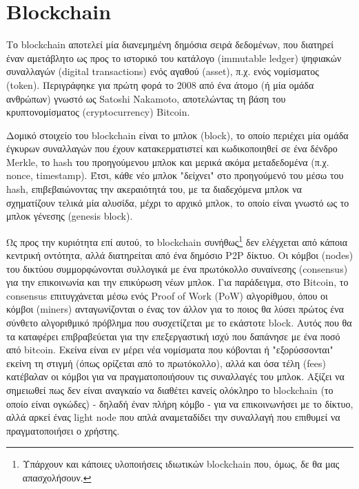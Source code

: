 \section{Blockchain}

Το blockchain αποτελεί μία διανεμημένη δημόσια σειρά δεδομένων, που διατηρεί έναν αμετάβλητο ως προς το ιστορικό του κατάλογο (immutable ledger) ψηφιακών συναλλαγών (digital transactions) ενός αγαθού (asset), π.χ. ενός νομίσματος (token). Περιγράφηκε για πρώτη φορά το 2008 από ένα άτομο (ή μία ομάδα ανθρώπων) γνωστό ως Satoshi Nakamoto, αποτελώντας τη βάση του κρυπτονομίσματος (cryptocurrency) Bitcoin.\cite{2.5-bitcoin}

Δομικό στοιχείο του blockchain είναι το μπλοκ (block), το οποίο περιέχει μία ομάδα έγκυρων συναλλαγών που έχουν κατακερματιστεί και κωδικοποιηθεί σε ένα δένδρο Merkle, το hash του προηγούμενου μπλοκ και μερικά ακόμα μεταδεδομένα (π.χ. nonce, timestamp). Έτσι, κάθε νέο μπλοκ "δείχνει" στο προηγούμενό του μέσω του hash, επιβεβαιώνοντας την ακεραιότητά του, με τα διαδεχόμενα μπλοκ να σχηματίζουν τελικά μία αλυσίδα, μέχρι το αρχικό μπλοκ, το οποίο είναι γνωστό ως το μπλοκ γένεσης (genesis block).\cite{2.5-blockchain}


Ως προς την κυριότητα επί αυτού, το blockchain συνήθως\footnote{Υπάρχουν και κάποιες υλοποιήσεις ιδιωτικών blockchain που, όμως, δε θα μας απασχολήσουν.} δεν ελέγχεται από κάποια κεντρική οντότητα, αλλά διατηρείται από ένα δημόσιο P2P δίκτυο. Οι κόμβοι (nodes) του δικτύου συμμορφώνονται συλλογικά με ένα πρωτόκολλο συναίνεσης (consensus) για την επικοινωνία και την επικύρωση νέων μπλοκ. Για παράδειγμα, στο Bitcoin, το consensus επιτυγχάνεται μέσω ενός Proof of Work (PoW) αλγορίθμου, όπου οι κόμβοι (miners) ανταγωνίζονται ο ένας τον άλλον για το ποιος θα λύσει πρώτος ένα σύνθετο αλγοριθμικό πρόβλημα που συσχετίζεται με το εκάστοτε block. Αυτός που θα τα καταφέρει επιβραβεύεται για την επεξεργαστική ισχύ που δαπάνησε με ένα ποσό από bitcoin. Εκείνα είναι εν μέρει νέα νομίσματα που κόβονται ή "εξορύσσονται" εκείνη τη στιγμή (όπως ορίζεται από το πρωτόκολλο), αλλά και όσα τέλη (fees) κατέβαλαν οι κόμβοι για να πραγματοποιήσουν τις συναλλαγές του μπλοκ. Αξίζει να σημειωθεί πως δεν είναι αναγκαίο να διαθέτει κανείς ολόκληρο το blockchain (το οποίο είναι ογκώδες) - δηλαδή έναν πλήρη κόμβο - για να επικοινωνήσει με το δίκτυο, αλλά αρκεί ένας light node που απλά αναμεταδίδει την συναλλαγή που επιθυμεί να πραγματοποιήσει ο χρήστης.

